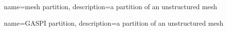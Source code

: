 


 {
name={mesh partition},
description={a partition of an unstructured mesh}
}

 {
name={GASPI partition},
description={a partition of an unstructured mesh}
}

